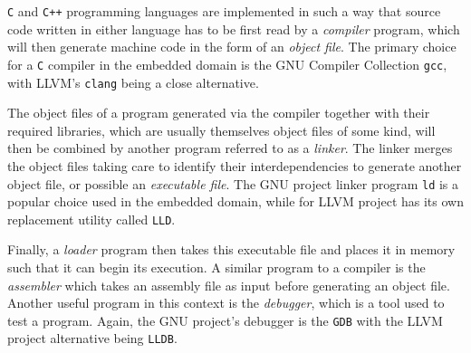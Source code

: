 \texttt{C} and \texttt{C++} programming languages are implemented in such a way that source code written in either language has to be first read by a \textit{compiler} program, which will then generate machine code in the form of an \textit{object file}. The primary choice for a \texttt{C} compiler in the embedded domain is the GNU Compiler Collection \texttt{gcc}, with LLVM's \texttt{clang} being a close alternative.

\begin{figure}[H]
	\centering
\end{figure}

The object files of a program generated via the compiler together with their required libraries, which are usually themselves object files of some kind, will then be combined by another program referred to as a \textit{linker}. The linker merges the object files taking care to identify their interdependencies to generate another object file, or possible an \textit{executable file}. The GNU project linker program \texttt{ld} is a popular choice used in the embedded domain, while for LLVM project has its own replacement utility called \texttt{LLD}.

\begin{figure}[H]
	\centering
\end{figure}

Finally, a \textit{loader} program then takes this executable file and places it in memory such that it can begin its execution. A similar program to a compiler is the \textit{assembler} which takes an assembly file as input before generating an object file. Another useful program in this context is the \textit{debugger}, which is a tool used to test a program. Again, the GNU project's debugger is the \texttt{GDB} with the LLVM project alternative being \texttt{LLDB}.

